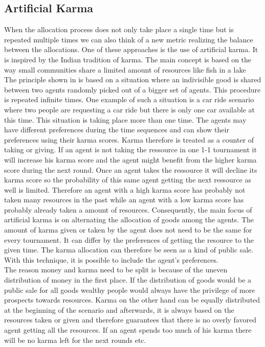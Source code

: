 \documentclass[german, a4paper, 11pt, oneside]{scrbook}
\begin{document}
\subsection{Artificial Karma}
When the allocation process does not only take place a single time but is repeated multiple times we can also think of a new metric realizing the balance between the allocations. One of these approaches is the use of artificial karma. It is inspired by the Indian tradition of karma. The main concept is based on the way small communities share a limited amount of resources like fish in a lake \cite{.c} \\The principle shown in \cite{Elokda.2023} is based on a situation where an indivisible good is shared between two agents randomly picked out of a bigger set of agents. This procedure is repeated infinite times. One example of such a situation is a car ride scenario where two people are requesting a car ride but there is only one car available at this time. This situation is taking place more than one time. The agents may have different preferences during the time sequences and can show their preferences using their karma scores. Karma therefore is treated as a counter of taking or giving. If an agent is not taking the ressource in one 1-1 tournament it will increase his karma score and the agent might benefit from the higher karma score during the next round. Once an agent takes the ressource it will decline its karma score so the probability of this same agent getting the next ressource as well is limited. Therefore an agent with a high karma score has probably not taken many resources in the past while an agent with a low karma score has probably already taken a amount of resources. Consequently, the main focus of artificial karma is on alternating the allocation of goods among the agents.  The amount of karma given or taken by the agent does not need to be the same for every tournament. It can differ by the preferences of getting the resource to the given time. The karma allocation can therefore be seen as a kind of public sale. With this technique, it is possible to include the agent's preferences. \\The reason money and karma need to be split is because of the uneven distribution of money in the first place. If the distribution of goods would be a public sale for all goods wealthy people would always have the privilege of more prospects towards resources. Karma on the other hand can be equally distributed at the beginning of the scenario and afterwards, it is always based on the resources taken or given and therefore guarantees that there is no overly favored agent getting all the resources. If an agent spends too much of his karma there will be no karma left for the next rounds etc.  \cite{Elokda.2023}
\end{document}
